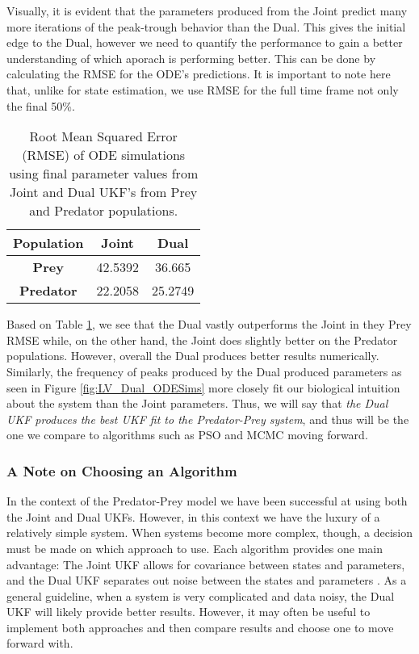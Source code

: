 \documentclass{article}
\begin{document}
Visually, it is evident that the parameters produced from the Joint predict many more iterations of the peak-trough behavior than the Dual. This gives the initial edge to the Dual, however we need to quantify the performance to gain a better understanding of which aporach is performing better. This can be done by calculating the RMSE for the ODE's predictions. It is important to note here that, unlike for state estimation, we use RMSE for the full time frame not only the final 50\%.

\begin{table}[H]
  \begin{center}
    \label{tab:table1}
    \begin{tabular}{c|c|c} %
      \textbf{Population} & \textbf{Joint} & \textbf{Dual} \\
      \hline
      \textbf{Prey} & 42.5392 & 36.665\\
      \textbf{Predator} & 22.2058 & 25.2749
    \end{tabular}
    \caption{Root Mean Squared Error (RMSE) of ODE simulations using final parameter values from Joint and Dual UKF's from Prey and Predator populations.}
    \label{table:LV_ODESims_RMSE}
  \end{center}
\end{table}

Based on Table \ref{table:LV_ODESims_RMSE}, we see that the Dual vastly outperforms the Joint in they Prey RMSE while, on the other hand, the Joint does slightly better on the Predator populations. However, overall the Dual produces better results numerically. Similarly, the frequency of peaks produced by the Dual produced parameters as seen in Figure \ref{fig:LV_Dual_ODESims} more closely fit our biological intuition about the system than the Joint parameters. Thus, we will say that \emph{the Dual UKF produces the best UKF fit to the Predator-Prey system}, and thus will be the one we compare to algorithms such as PSO and MCMC moving forward.


\subsubsection{A Note on Choosing an Algorithm}
In the context of the Predator-Prey model we have been successful at using both the Joint and Dual UKFs. However, in this context we have the luxury of a relatively simple system. When systems become more complex, though, a decision must be made on which approach to use. Each algorithm provides one main advantage: The Joint UKF allows for covariance between states and parameters, and the Dual UKF separates out noise between the states and parameters \cite{GoveHollingerDual}. As a general guideline, when a system is very complicated and data noisy, the Dual UKF will likely provide better results. However, it may often be useful to implement both approaches and then compare results and choose one to move forward with.
\\
\end{document}
